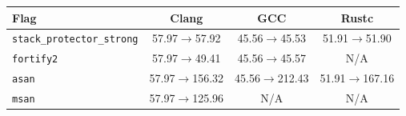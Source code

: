 \begin{tabular*}{\columnwidth}{@{\extracolsep\fill}lccc@{\extracolsep\fill}}
\toprule
\textbf{Flag} & \textbf{Clang} & \textbf{GCC} & \textbf{Rustc} \\
\midrule
\texttt{stack\_protector\_strong} & 57.97$\to$57.92 & 45.56$\to$45.53 & 51.91$\to$51.90 \\
\texttt{fortify2} & 57.97$\to$49.41 & 45.56$\to$45.57 & N/A \\
\texttt{asan} & 57.97$\to$156.32 & 45.56$\to$212.43 & 51.91$\to$167.16 \\
\texttt{msan} & 57.97$\to$125.96 & N/A & N/A \\
\bottomrule
\end{tabular*}
